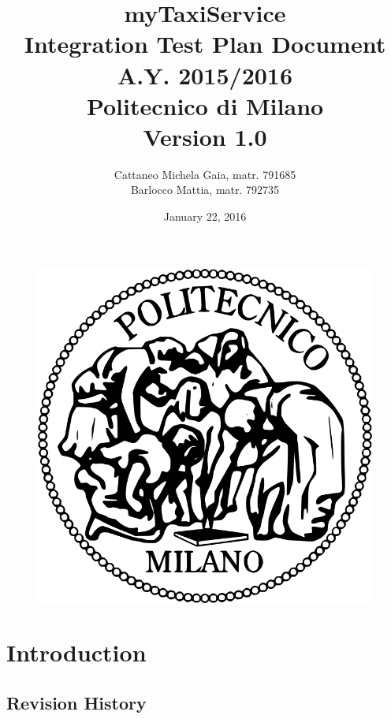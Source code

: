 \documentclass[18pt,oneside,a4paper, titlepage]{article}
\begin{document}
\begin{figure}[t]
	\centering
	\includegraphics[scale=0.35]{logo-polimi.png}
\end{figure}
\title{\textbf{myTaxiService}\\\textbf{I}ntegration \textbf{T}est \textbf{P}lan \textbf{D}ocument\\ A.Y. 2015/2016\\
	Politecnico di Milano \\ Version 1.0}	
\author{Cattaneo Michela Gaia, matr. 791685\\Barlocco Mattia, matr. 792735 }
\date{January 22, 2016}
\maketitle

\newpage
	\tableofcontents

\newpage
\section{Introduction}
	\subsection{Revision History}
\end{document}

